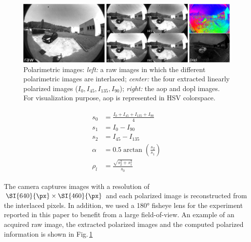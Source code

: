 \begin{figure}
  \centering
  \includegraphics[width=1.0\textwidth]{./content/intro/figures/image_pola.jpeg}
  \caption{Polarimetric images: \emph{left:} a raw images in which the
    different polarimetric images are interlaced; \emph{center:} the four
    extracted linearly polarized images ($I_0, I_{45}, I_{135}, I_{90}$);
    \emph{right:} the \gls{aop} and \gls{dopl} images. For visualization purpose,
    \gls{aop} is represented in HSV colorspace.}
  \label{fig:raw-sp}
\end{figure}





\begin{gather}
  \begin{aligned}
    s_0 & = \frac{I_0 + I_{45} + I_{135} + I_{90}}{4}\\
    s_1 & = I_0 - I_{90} \\
    s_2 & = I_{45} - I_{135} \\
    \alpha &= 0.5 \arctan(\frac{s_2}{s_1}) \\
    \rho_l &= \frac{\sqrt{s_2^{2} + s_1^{2}}}{s_0}
    \label{eq:stokes}
  \end{aligned}
\end{gather}

The camera captures images with a resolution of $\SI{640}{\px} \times
\SI{460}{\px}$ and each polarized image is reconstructed from the interlaced
pixels. In addition, we used a \ang{180} fisheye lens for the experiment
reported in this paper to benefit from a large field-of-view. An example of an
acquired raw image, the extracted polarized images and the computed polarized
information is shown in Fig.\,\ref{fig:raw-sp}

